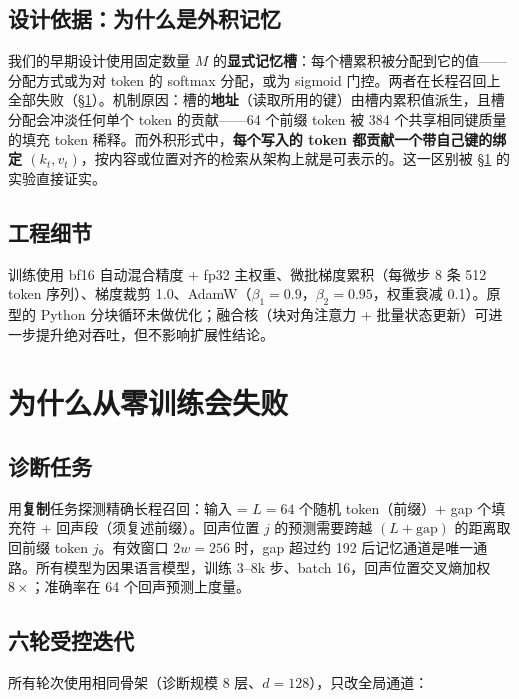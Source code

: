 \documentclass[11pt]{ctexart}
\begin{document}
\subsection{设计依据：为什么是外积记忆}

我们的早期设计使用固定数量 $M$ 的\textbf{显式记忆槽}：每个槽累积被分配到它的值——分配方式或为对 token 的 softmax 分配，或为 sigmoid 门控。两者在长程召回上全部失败（\S\ref{sec:scratch}）。机制原因：槽的\textbf{地址}（读取所用的键）由槽内累积值派生，且槽分配会冲淡任何单个 token 的贡献——64 个前缀 token 被 384 个共享相同键质量的填充 token 稀释。而外积形式中，\textbf{每个写入的 token 都贡献一个带自己键的绑定 $(k_t, v_t)$}，按内容或位置对齐的检索从架构上就是可表示的。这一区别被 \S\ref{sec:scratch} 的实验直接证实。

\subsection{工程细节}

训练使用 bf16 自动混合精度 + fp32 主权重、微批梯度累积（每微步 8 条 512 token 序列）、梯度裁剪 1.0、AdamW（$\beta_1{=}0.9$，$\beta_2{=}0.95$，权重衰减 0.1）。原型的 Python 分块循环未做优化；融合核（块对角注意力 + 批量状态更新）可进一步提升绝对吞吐，但不影响扩展性结论。

\section{为什么从零训练会失败}\label{sec:scratch}

\subsection{诊断任务}

用\textbf{复制}任务探测精确长程召回：输入 = $L{=}64$ 个随机 token（前缀）+ gap 个填充符 + 回声段（须复述前缀）。回声位置 $j$ 的预测需要跨越 $(L+\mathrm{gap})$ 的距离取回前缀 token $j$。有效窗口 $2w=256$ 时，gap 超过约 192 后记忆通道是唯一通路。所有模型为因果语言模型，训练 3--8k 步、batch 16，回声位置交叉熵加权 $8\times$；准确率在 64 个回声预测上度量。

\subsection{六轮受控迭代}

所有轮次使用相同骨架（诊断规模 8 层、$d{=}128$），只改全局通道：
\end{document}
